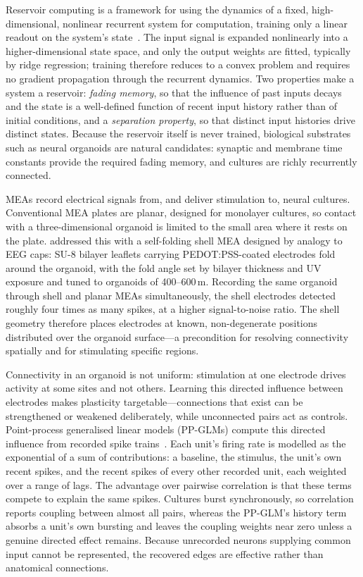 \documentclass[fullpaper]{nldl}
\newcommand{\um}{\,\textmu m}
\begin{document}
Reservoir computing is a framework for using the dynamics of a fixed, high-dimensional, nonlinear recurrent system for computation, training only a linear readout on the system's state~\citep{jaeger2001echo,maass2002realtime}. The input signal is expanded nonlinearly into a higher-dimensional state space, and only the output weights are fitted, typically by ridge regression; training therefore reduces to a convex problem and requires no gradient propagation through the recurrent dynamics. Two properties make a system a reservoir: \emph{fading memory}, so that the influence of past inputs decays and the state is a well-defined function of recent input history rather than of initial conditions, and a \emph{separation property}, so that distinct input histories drive distinct states. Because the reservoir itself is never trained, biological substrates such as neural organoids are natural candidates: synaptic and membrane time constants provide the required fading memory, and cultures are richly recurrently connected.

MEAs record electrical signals from, and deliver stimulation to, neural cultures. Conventional MEA plates are planar, designed for monolayer cultures, so contact with a three-dimensional organoid is limited to the small area where it rests on the plate.  addressed this with a self-folding shell MEA designed by analogy to EEG caps: SU-8 bilayer leaflets carrying PEDOT:PSS-coated electrodes fold around the organoid, with the fold angle set by bilayer thickness and UV exposure and tuned to organoids of 400--600\um. Recording the same organoid through shell and planar MEAs simultaneously, the shell electrodes detected roughly four times as many spikes, at a higher signal-to-noise ratio. The shell geometry therefore places electrodes at known, non-degenerate positions distributed over the organoid surface---a precondition for resolving connectivity spatially and for stimulating specific regions.

Connectivity in an organoid is not uniform: stimulation at one electrode drives activity at some sites and not others. Learning this directed influence between electrodes makes plasticity targetable---connections that exist can be strengthened or weakened deliberately, while unconnected pairs act as controls. Point-process generalised linear models (PP-GLMs) compute this directed influence from recorded spike trains~\citep{truccolo2005point,pillow2008spatiotemporal}. Each unit's firing rate is modelled as the exponential of a sum of contributions: a baseline, the stimulus, the unit's own recent spikes, and the recent spikes of every other recorded unit, each weighted over a range of lags. The advantage over pairwise correlation is that these terms compete to explain the same spikes. Cultures burst synchronously, so correlation reports coupling between almost all pairs, whereas the PP-GLM's history term absorbs a unit's own bursting and leaves the coupling weights near zero unless a genuine directed effect remains. Because unrecorded neurons supplying common input cannot be represented, the recovered edges are effective rather than anatomical connections.
\end{document}
